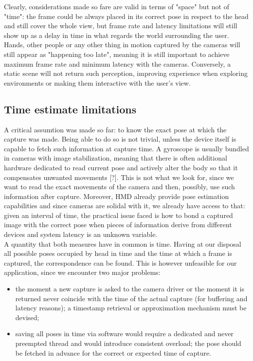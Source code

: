 Clearly, considerations made so fare are valid in terms of "space" but not of "time": the frame could be always placed in its correct pose in respect to the head and still cover the whole view, but frame rate and latency limitations will still show up as a delay in time in what regards the world surrounding the user. Hands, other people or any other thing in motion captured by the cameras will still appear as "happening too late", meaning it is still important to achieve maximum frame rate and minimum latency with the cameras. Conversely, a static scene will not return such perception, improving experience when exploring environments or making them interactive with the user's view.

\subsection{Time estimate limitations}
A critical assumtion was made so far: to know the exact pose at which the capture was made. Being able to do so is not trivial, unless the device itself is capable to fetch such information at capture time. A gyroscope is usually bundled in cameras with image stabilization, meaning that there is often additional hardware dedicated to read current pose and actively alter the body so that it compensates unwanted movements [?]. This is not what we look for, since we want to read the exact movements of the camera and then, possibly, use such information after capture. Moreover, HMD already provide pose estimation capabilities and since cameras are solidal with it, we already have access to that: given an interval of time, the practical issue faced is how to bond a captured image with the correct pose when pieces of information derive from different devices and system latency is an unknown variable.\\
A quantity that both measures have in common is time. Having at our disposal all possible poses occupied by head in time and the time at which a frame is captured, the correspondence can be found. This is however unfeasible for our application, since we encounter two major problems:
\begin{itemize}
\item the moment a new capture is asked to the camera driver or the moment it is returned never coincide with the time of the actual capture (for buffering and latency reasons); a timestamp retrieval or approximation mechanism must be devised;
\item saving all poses in time via software would require a dedicated and never preempted thread and would introduce consistent overload; the pose should be fetched in advance for the correct or expected time of capture.
\end{itemize}
